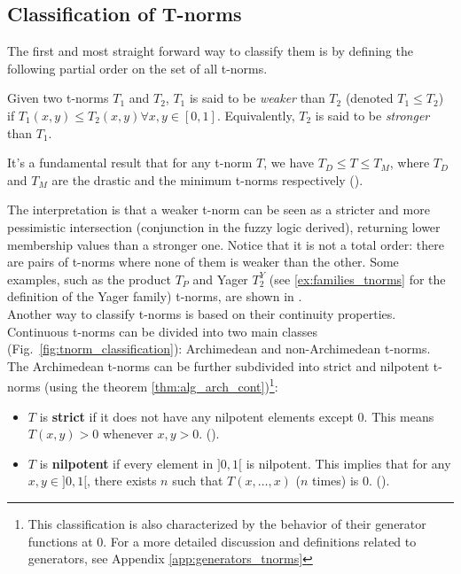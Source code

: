 \subsection{Classification of T-norms}\label{sec:class_tnorms}
The first and most straight forward way to classify them is by defining the following partial order on the set of all t-norms. 
\begin{definition}\label{def:weaker}
  Given two t-norms $T_1$ and $T_2$, $T_1$ is said to be \emph{weaker} than $T_2$ (denoted $T_1 \leq T_2$) if $T_1(x,y) \leq T_2(x,y) \forall x,y \in [0,1]$.
  Equivalently, $T_2$ is said to be \emph{stronger} than $T_1$.
\end{definition}

\begin{remark}
  It's a fundamental result that for any t-norm $T$, we have $T_D \leq T \leq T_M$, where $T_D$ and $T_M$ are the drastic and the minimum t-norms respectively (\cite[Rem.~1.5]{Klement2000}).
\end{remark}

The interpretation is that a weaker t-norm can be seen as a stricter and more pessimistic intersection (conjunction in the fuzzy logic derived), returning lower membership values than a stronger one. Notice that it is not a total order: there are pairs of t-norms where none of them is weaker than the other. Some examples, such as the product $T_P$ and Yager $T_2^Y$ (see \ref{ex:families_tnorms} for the definition of the Yager family) t-norms, are shown in \cite[Fig.~6.1]{Klement2000}.\\


Another way to classify t-norms is based on their continuity properties. Continuous t-norms can be divided into two main classes (Fig.~\ref{fig:tnorm_classification}): Archimedean and non-Archimedean t-norms. The Archimedean t-norms can be further subdivided into strict and nilpotent t-norms (using the theorem \ref{thm:alg_arch_cont})\footnote{This classification is also characterized by the behavior of their generator functions at 0. For a more detailed discussion and definitions related to generators, see Appendix \ref{app:generators_tnorms}}:

\begin{itemize}
    \item $T$ is \textbf{strict} if it does not have any nilpotent elements except $0$. This means $T(x,y)>0$ whenever $x,y > 0$. (\cite[Cor.~3.30(i)]{Klement2000}).
    \item $T$ is \textbf{nilpotent} if every element in $]0,1[$ is nilpotent. This implies that for any $x,y \in ]0,1[$, there exists $n$ such that $T(x, \dots, x)$ ($n$ times) is $0$. (\cite[Cor.~3.30(ii)]{Klement2000}).
\end{itemize}


